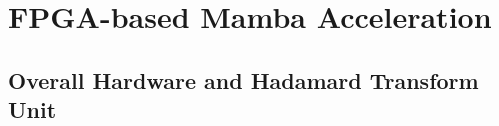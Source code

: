 
\section{FPGA-based Mamba Acceleration}
\label{sec:Hardware design}



\subsection{Overall Hardware and Hadamard Transform Unit}
\label{subsec:Overall_architecture}



